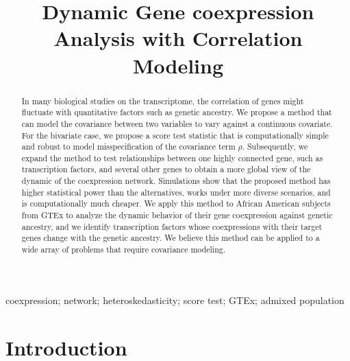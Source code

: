\documentclass[aap,authoryear, preprint]{imsart}
\numberwithin{equation}{section}
\theoremstyle{plain}
\begin{document}
\begin{frontmatter}
\title{Dynamic Gene coexpression Analysis with Correlation Modeling}


\begin{abstract}
In many biological studies on the transcriptome, the correlation of genes might fluctuate with quantitative factors such as genetic ancestry. We propose a method that can model the covariance between two variables to vary against a continuous covariate. For the bivariate case, we propose a score test statistic that is computationally simple and robust to model misspecification of the covariance term $\rho$. Subsequently, we expand the method to test relationships between one highly connected gene, such as transcription factors, and several other genes to obtain a more global view of the dynamic of the coexpression network. Simulations show that the proposed method has higher statistical power than the alternatives, works under more diverse scenarios, and is computationally much cheaper. We apply this method to African American subjects from GTEx to analyze the dynamic behavior of their gene coexpression against genetic ancestry, and we identify transcription factors whose coexpressions with their target genes change with the genetic ancestry. We believe this method can be applied to a wide array of problems that require covariance modeling.
\end{abstract}

\begin{keyword}
coexpression; network; heteroskedasticity; score test; GTEx; admixed population
\end{keyword}

\end{frontmatter}
\section{Introduction}
\end{document}
